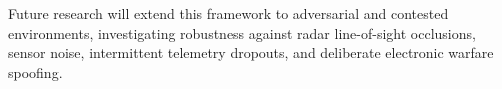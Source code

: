 \documentclass[9pt]{ieeeconf}
\begin{document}
Future research will extend this framework to adversarial and contested environments, investigating robustness against radar line-of-sight occlusions, sensor noise, intermittent telemetry dropouts, and deliberate electronic warfare spoofing.



\end{document}
